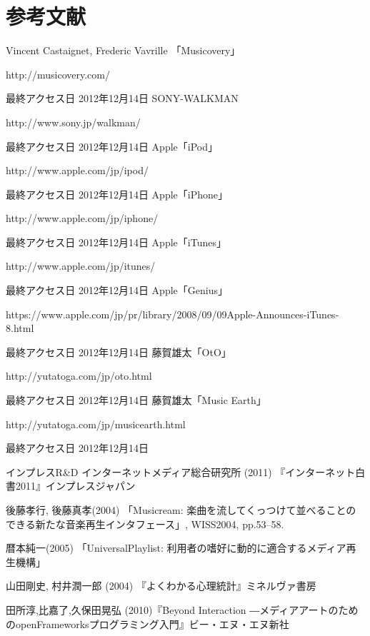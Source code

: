 \documentclass[a4paper, 11pt, onecolumn, report]{jsarticle}
\begin{document}
\section{参考文献}
\begin{thebibliography}{99}
Vincent Castaignet, Frederic Vavrille 「Musicovery」
\par
http://musicovery.com/
\par
最終アクセス日 2012年12月14日
SONY-WALKMAN
\par
http://www.sony.jp/walkman/
\par
最終アクセス日 2012年12月14日
Apple「iPod」
\par
http://www.apple.com/jp/ipod/
\par
最終アクセス日 2012年12月14日
Apple「iPhone」
\par
http://www.apple.com/jp/iphone/
\par
最終アクセス日 2012年12月14日
Apple「iTunes」
\par
http://www.apple.com/jp/itunes/
\par
最終アクセス日 2012年12月14日
Apple「Genius」
\par
https://www.apple.com/jp/pr/library/2008/09/09Apple-Announces-iTunes-8.html
\par
最終アクセス日 2012年12月14日
藤賀雄太「OtO」
\par
http://yutatoga.com/jp/oto.html
\par
最終アクセス日 2012年12月14日
藤賀雄太「Music Earth」
\par
http://yutatoga.com/jp/musicearth.html
\par
最終アクセス日 2012年12月14日

インプレスR\&D インターネットメディア総合研究所 (2011) 『インターネット白書2011』インプレスジャパン

後藤孝行, 後藤真孝(2004)
「Musicream: 楽曲を流してくっつけて並べることのできる新たな音楽再生インタフェース」, WISS2004, pp.53--58.

暦本純一(2005)
「UniversalPlaylist: 利用者の嗜好に動的に適合するメディア再生機構」

山田剛史, 村井潤一郎 (2004) 『よくわかる心理統計』ミネルヴァ書房

田所淳,比嘉了,久保田晃弘 (2010)『Beyond Interaction ―メディアアートのためのopenFrameworksプログラミング入門』ビー・エヌ・エヌ新社
\end{thebibliography}
\end{document}
